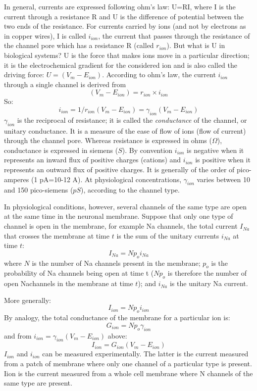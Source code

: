 \documentclass[../../Orator]{subfiles}
\begin{document}
In general, currents are expressed following ohm’s law: U=RI, where I is the current through a resistance R and U is the difference of potential between the two ends of the resistance. For currents carried by ions (and not by electrons as in copper wires), I is called  \(i_{ion}\), the current that passes through the resistance of the channel pore which has a resistance R (called  \(r_{ion}\)). But what is U in biological systems? U is the force that makes ions move in a particular direction; it is the electrochemical gradient for the considered ion and is also called the driving force: \(U=(V_m-E_{ion})\). According to ohm’s law, the current \(i_{ion}\) through a single channel is derived from \[(V_m - E_{ion}) = r_{ion}\times i_{ion}\]
So:\[i_{ion}=1/r_{ion}(V_m - E_{ion})= \gamma_{ion}(V_m - E_{ion}) \]
\(\gamma_{ion}\) is the reciprocal of resistance; it is called the \textit{conductance} of the channel, or unitary conductance. It is a measure of the ease of flow of ions (flow of current) through the channel pore. Whereas resistance is expressed in ohms (\(\Omega\)), conductance is expressed in siemens (\(S\)). By convention \(i_{ion} \) is negative when it represents an inward flux of positive charges (cations) and \( i_{ion}\) is positive when it represents an outward flux of positive charges. It is generally of the order of pico-amperes (1 pA=10-12 A). At physiological concentrations, \(\gamma_{ion}\) varies between 10 and 150 pico-siemens (\(pS\)), according to the channel type. 

In physiological conditions, however,  several channels of the same type are open at the same time in the neuronal membrane. Suppose that only one type of channel is open in the membrane, for example \gls{Na} channels, the total current \(I_{Na}\) that crosses the membrane at time \(t\) is the sum of the unitary currents \(i_{Na}\) at time \(t\):\[I_{Na} = N p_o i_{Na}\]
where \(N\) is the number of \gls{Na} channels present in the membrane; \(p_o\) is the probability of \gls{Na} channels being open at time t (\(N p_o\) is therefore the number of open \gls{Na}channels in the membrane at time \(t\)); and \(i_{Na}\) is the unitary \gls{Na} current.  

More generally:\[I_{ion} = N p_o i_{ion}\]
By analogy, the total conductance of the membrane for a particular ion is: \[G_{ion} = N p_o \gamma_{ion}\]
and from \(i_{ion}=\gamma_{ion}(V_m - E_{ion})\) above: 
\[I_{ion}= G_{ion}(V_m - E_{ion})\]
 \(I_{ion}\) and \(i_{ion}\) can be measured experimentally. The latter is the current measured from a patch of membrane where only one channel of a particular type is present. Iion is the current measured from a whole cell membrane where N channels of the same type are present. 
 
\end{document}
